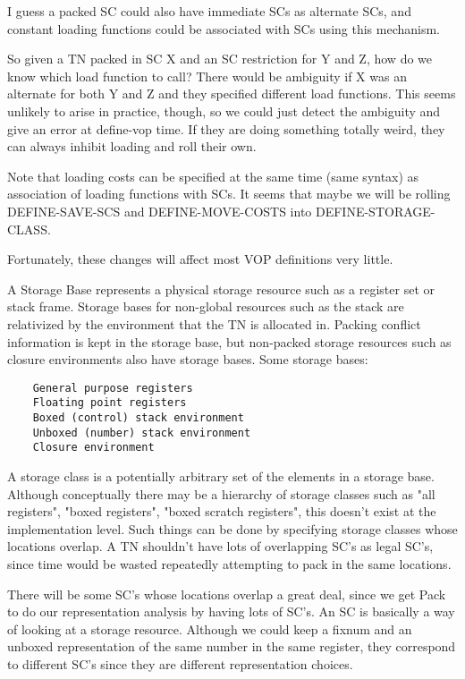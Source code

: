 I guess a packed SC could also have immediate SCs as alternate SCs, and
constant loading functions could be associated with SCs using this mechanism.

So given a TN packed in SC X and an SC restriction for Y and Z, how do we know
which load function to call?  There would be ambiguity if X was an alternate
for both Y and Z and they specified different load functions.  This seems
unlikely to arise in practice, though, so we could just detect the ambiguity
and give an error at define-vop time.  If they are doing something totally
weird, they can always inhibit loading and roll their own.

Note that loading costs can be specified at the same time (same syntax) as
association of loading functions with SCs.  It seems that maybe we will be
rolling DEFINE-SAVE-SCS and DEFINE-MOVE-COSTS into DEFINE-STORAGE-CLASS.

Fortunately, these changes will affect most VOP definitions very little.


A Storage Base represents a physical storage resource such as a register set or
stack frame.  Storage bases for non-global resources such as the stack are
relativized by the environment that the TN is allocated in.  Packing conflict
information is kept in the storage base, but non-packed storage resources such
as closure environments also have storage bases.
Some storage bases:
\begin{verbatim}
    General purpose registers
    Floating point registers
    Boxed (control) stack environment
    Unboxed (number) stack environment
    Closure environment
\end{verbatim}

A storage class is a potentially arbitrary set of the elements in a storage
base.  Although conceptually there may be a hierarchy of storage classes such
as "all registers", "boxed registers", "boxed scratch registers", this doesn't
exist at the implementation level.  Such things can be done by specifying
storage classes whose locations overlap.  A TN shouldn't have lots of
overlapping SC's as legal SC's, since time would be wasted repeatedly
attempting to pack in the same locations.

There will be some SC's whose locations overlap a great deal, since we get Pack
to do our representation analysis by having lots of SC's.  An SC is basically a
way of looking at a storage resource.  Although we could keep a fixnum and an
unboxed representation of the same number in the same register, they correspond
to different SC's since they are different representation choices.

